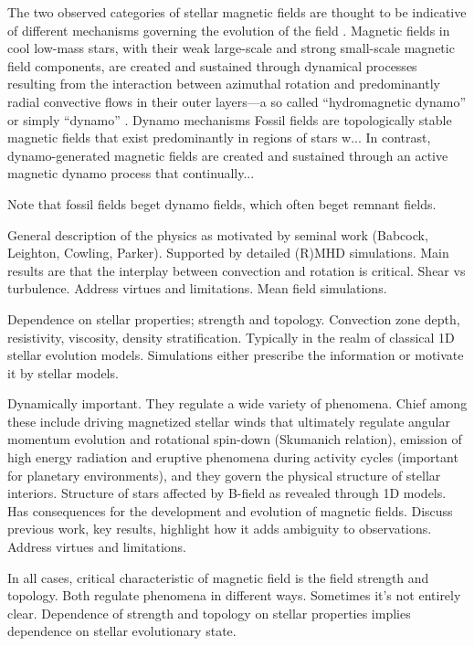 \documentclass[12pt,a4paper]{article}
\begin{document}
The two observed categories of stellar magnetic fields are thought to be indicative of different mechanisms governing the evolution of the field \citep{Donati2009}. Magnetic fields in cool low-mass stars, with their weak large-scale and strong small-scale magnetic field components, are created and sustained through dynamical processes resulting from the interaction between azimuthal rotation and predominantly radial convective flows in their outer layers---a so called ``hydromagnetic dynamo'' or simply ``dynamo'' \citep{Parker1955}. %
Dynamo mechanisms 
Fossil fields are topologically stable magnetic fields that exist predominantly in regions of stars w... In contrast, dynamo-generated magnetic fields are created and sustained through an active magnetic dynamo process that continually... 

Note that fossil fields beget dynamo fields, which often beget remnant fields.

General description of the physics as motivated by seminal work (Babcock, Leighton, Cowling, Parker). Supported by detailed (R)MHD simulations. Main results are that the interplay between convection and rotation is critical. Shear vs turbulence. Address virtues and limitations. Mean field simulations.

Dependence on stellar properties; strength and topology. Convection zone depth, resistivity, viscosity, density stratification. Typically in the realm of classical 1D stellar evolution models. Simulations either prescribe the information or motivate it by stellar models.

Dynamically important. They regulate a wide variety of phenomena. Chief among these include driving magnetized stellar winds that ultimately regulate angular momentum evolution and rotational spin-down (Skumanich relation), emission of high energy radiation and eruptive phenomena during activity cycles (important for planetary environments), and they govern the physical structure of stellar interiors. Structure of stars affected by B-field as revealed through 1D models. Has consequences for the development and evolution of magnetic fields. Discuss previous work, key results, highlight how it adds ambiguity to observations. Address virtues and limitations.

In all cases, critical characteristic of magnetic field is the field strength and topology. Both regulate phenomena in different ways. Sometimes it's not entirely clear. Dependence of strength and topology on stellar properties implies dependence on stellar evolutionary state. 
\end{document}
